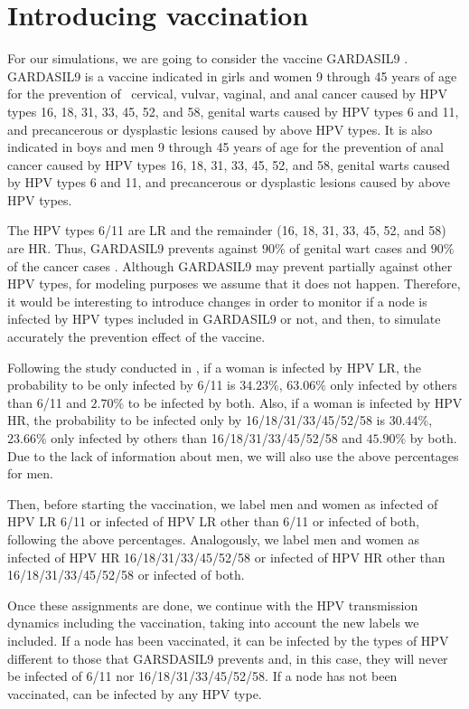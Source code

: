 \section{Introducing vaccination} 
For our simulations, we are going to consider the vaccine GARDASIL9 \cite{gardasil9}. GARDASIL9 is a vaccine indicated in girls and women 9 through 45 years of age for the prevention of  cervical, vulvar, vaginal, and anal cancer caused by HPV types 16, 18, 31, 33, 45, 52, and 58,  genital warts caused by HPV types 6 and 11, and precancerous or dysplastic lesions caused by above HPV types. It is also indicated in boys and men 9 through 45 years of age for the prevention of anal cancer caused by HPV types 16, 18, 31, 33, 45, 52, and 58, genital warts caused by HPV types 6 and 11, and precancerous or dysplastic lesions caused by above HPV types.

The HPV types 6/11 are LR and the remainder (16, 18, 31, 33, 45, 52, and 58) are HR. Thus, GARDASIL9 prevents against $90\%$ of genital wart cases and $90\%$ of the cancer cases \cite{Hartwig2015}. Although GARDASIL9 may prevent partially against other HPV types, for modeling purposes we assume that it does not happen. Therefore, it would be interesting to introduce changes in order to monitor if a node is infected by HPV types included in GARDASIL9 or not, and then, to simulate accurately the prevention effect of the vaccine.

Following the study conducted in \cite{castellsague2012prevalence}, if a woman is infected by HPV LR, the probability to be only infected by 6/11 is $34.23\%$, $63.06\%$ only infected by others than 6/11 and $2.70\%$ to be infected by both. Also, if a woman is infected by HPV HR, the probability to be infected only by 16/18/31/33/45/52/58 is $30.44\%$, $23.66\%$ only infected by others than 16/18/31/33/45/52/58 and $45.90\%$ by both. Due to the lack of information about men, we will also use the above percentages for men.

Then, before starting the vaccination, we label men and women as infected of HPV LR 6/11 or infected of HPV LR other than 6/11 or infected of both, following the above percentages. Analogously, we label men and women as infected of HPV HR 16/18/31/33/45/52/58 or infected of HPV HR other than 16/18/31/33/45/52/58 or infected of both.

Once these assignments are done, we continue with the HPV transmission dynamics including the vaccination, taking into account the new labels we included. If a node has been vaccinated, it can be infected by the types of HPV different to those that GARSDASIL9 prevents and, in this case, they will never be infected of 6/11 nor 16/18/31/33/45/52/58. If a node has not been vaccinated, can be infected by any HPV type. 

